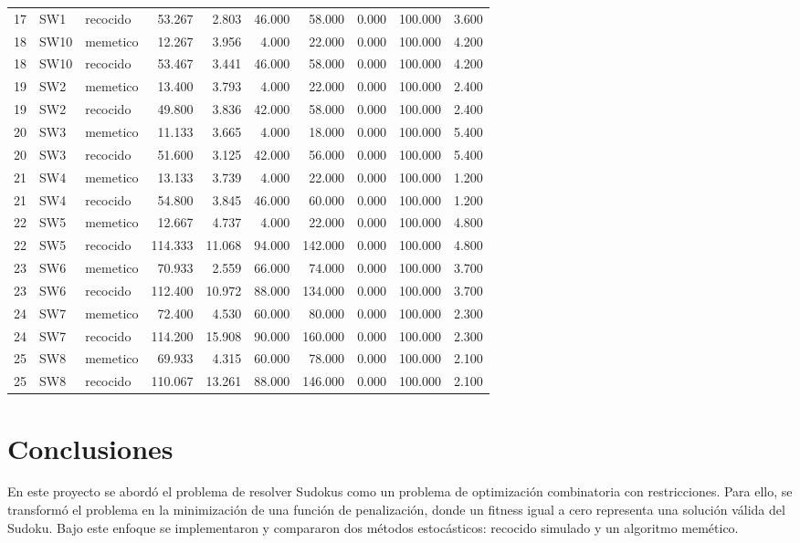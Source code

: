 \documentclass{article}
\begin{document}
\begin{landscape}
\begin{table}[p]
{\begin{tabular}{rllrrrrrrr}
17 & SW1 & recocido & 53.267 & 2.803 & 46.000 & 58.000 & 0.000 & 100.000 & 3.600 \\
18 & SW10 & memetico & 12.267 & 3.956 & 4.000 & 22.000 & 0.000 & 100.000 & 4.200 \\
18 & SW10 & recocido & 53.467 & 3.441 & 46.000 & 58.000 & 0.000 & 100.000 & 4.200 \\
19 & SW2 & memetico & 13.400 & 3.793 & 4.000 & 22.000 & 0.000 & 100.000 & 2.400 \\
19 & SW2 & recocido & 49.800 & 3.836 & 42.000 & 58.000 & 0.000 & 100.000 & 2.400 \\
20 & SW3 & memetico & 11.133 & 3.665 & 4.000 & 18.000 & 0.000 & 100.000 & 5.400 \\
20 & SW3 & recocido & 51.600 & 3.125 & 42.000 & 56.000 & 0.000 & 100.000 & 5.400 \\
21 & SW4 & memetico & 13.133 & 3.739 & 4.000 & 22.000 & 0.000 & 100.000 & 1.200 \\
21 & SW4 & recocido & 54.800 & 3.845 & 46.000 & 60.000 & 0.000 & 100.000 & 1.200 \\
22 & SW5 & memetico & 12.667 & 4.737 & 4.000 & 22.000 & 0.000 & 100.000 & 4.800 \\
22 & SW5 & recocido & 114.333 & 11.068 & 94.000 & 142.000 & 0.000 & 100.000 & 4.800 \\
23 & SW6 & memetico & 70.933 & 2.559 & 66.000 & 74.000 & 0.000 & 100.000 & 3.700 \\
23 & SW6 & recocido & 112.400 & 10.972 & 88.000 & 134.000 & 0.000 & 100.000 & 3.700 \\
24 & SW7 & memetico & 72.400 & 4.530 & 60.000 & 80.000 & 0.000 & 100.000 & 2.300 \\
24 & SW7 & recocido & 114.200 & 15.908 & 90.000 & 160.000 & 0.000 & 100.000 & 2.300 \\
25 & SW8 & memetico & 69.933 & 4.315 & 60.000 & 78.000 & 0.000 & 100.000 & 2.100 \\
25 & SW8 & recocido & 110.067 & 13.261 & 88.000 & 146.000 & 0.000 & 100.000 & 2.100 \\
\bottomrule
\end{tabular}
}
\end{table}
\end{landscape}
\section{Conclusiones}
En este proyecto se abordó el problema de resolver Sudokus como un problema de optimización combinatoria con restricciones. Para ello, se transformó el problema en la minimización de una función de penalización, donde un fitness igual a cero representa una solución válida del Sudoku. Bajo este enfoque se implementaron y compararon dos métodos estocásticos: recocido simulado y un algoritmo memético.
\end{document}
